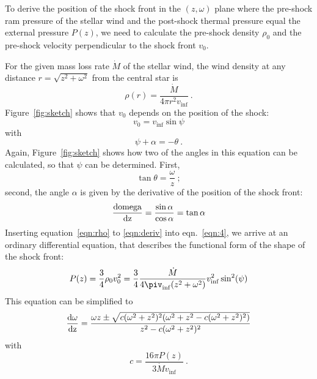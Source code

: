 To derive the position of the shock front in the $(z, \omega)$ plane where the pre-shock ram pressure of the stellar wind and the post-shock thermal pressure equal the external pressure $P(z)$, we need to calculate the pre-shock density $\rho_0$ and the pre-shock velocity perpendicular to the shock front $v_0$.

For the given mass loss rate $\dot M$ of the stellar wind, the wind density at any distance $r=\sqrt{z^2+\omega^2}$ from the central star is 
\begin{equation}\label{eqn:rho}
\rho(r) = \frac{\dot M}{4 \pi r^2 v_{\inf}}\ .
\end{equation}
Figure~\ref{fig:sketch} shows that $v_0$ depends on the position of the shock:
\begin{equation}\label{eqn:v0}
v_0 = v_{\inf} \sin \psi
\end{equation}
with 
\begin{equation}\label{eqn:angle}
\psi+\alpha = - \theta \ .
\end{equation}
Again, Figure~\ref{fig:sketch} shows how two of the angles in this equation can be calculated, so that $\psi$ can be determined. First,
\begin{equation}
\tan\theta = \frac{\omega}{z}\ ;
\end{equation}
second, the angle $\alpha$ is given by the derivative of the position of the shock front:
\begin{equation}\label{eqn:deriv}
\frac{\rm{d}omega}{\rm{d}z} = \frac{\sin \alpha}{\cos \alpha} = \tan{\alpha}
\end{equation}
Inserting equation~\ref{eqn:rho} to \ref{eqn:deriv} into eqn.~\ref{eqn:4}, we arrive at an ordinary differential equation, that describes the functional form of the shape of the shock front:
\begin{equation}
P(z) = \frac{3}{4}\rho_0v_0^2 = \frac{3}{4} \frac{\dot{M}}{4\piv_{\inf}(z^2+\omega^2)} v_{\inf}^2 \sin^2(\psi)
\end{equation}
This equation can be simplified to
\begin{equation}\label{eqn:ode}
\frac{\rm{d}\omega}{\rm{d}z} = \frac{\omega z \pm \sqrt{c (\omega^2+z^2)^2 (\omega^2+z^2-c(\omega^2+z^2)^2)}}{z^2 - c(\omega^2+z^2)^2}
\end{equation}
with
\begin{equation}
c = \frac{16\pi P(z)}{3 \dot{M} v_{\inf}}\ .
\end{equation}